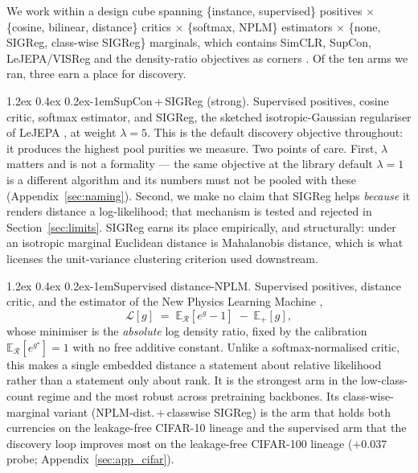 \documentclass{article}
\makeatletter
\renewcommand\paragraph{\@startsection{paragraph}{4}{\z@}%
  {1.2ex \@plus 0.4ex \@minus 0.2ex}{-1em}{\normalsize\bf}}
\newcommand{\E}{\mathbb{E}}
\newcommand{\R}{\mathcal{R}}
\makeatother
\begin{document}
We work within a design cube spanning
\{instance, supervised\} positives $\times$
\{cosine, bilinear, distance\} critics $\times$
\{softmax, NPLM\} estimators $\times$
\{none, SIGReg, class-wise SIGReg\} marginals, which contains SimCLR,
SupCon, LeJEPA/VISReg and the density-ratio objectives as corners
\citep{chen2020simclr,khosla2020supcon,balestriero2025lejepa,wu2026visreg,dagnolo2019nplm}.
Of the ten arms we ran, three earn a place for discovery.

\paragraph{SupCon\,+\,SIGReg (strong).}
Supervised positives, cosine critic, softmax estimator, and SIGReg, the
sketched isotropic-Gaussian regulariser of LeJEPA
\citep{balestriero2025lejepa}, at weight $\lambda = 5$. This is the default discovery objective throughout: it
produces the highest pool purities we measure. Two points of care. First, $\lambda$ matters and is not a formality --- the same objective
at the library default $\lambda = 1$ is a different algorithm and its numbers
must not be pooled with these (Appendix~\ref{sec:naming}). Second, we make no
claim that SIGReg helps \emph{because} it renders distance a log-likelihood;
that mechanism is tested and rejected in Section~\ref{sec:limits}. SIGReg
earns its place empirically, and structurally: under an isotropic marginal
Euclidean distance is Mahalanobis distance, which is what licenses the
unit-variance clustering criterion used downstream.

\paragraph{Supervised distance-NPLM.}
Supervised positives, distance critic, and the estimator of the New Physics
Learning Machine \citep[NPLM;][]{dagnolo2019nplm},
\begin{equation}
\label{eq:nplm}
\mathcal{L}[g] \;=\; \E_{\R}\!\left[e^{g} - 1\right] \;-\; \E_{+}\!\left[g\right],
\end{equation}
whose minimiser is the \emph{absolute} log density ratio, fixed by the
calibration $\E_{\R}[e^{g^\star}] = 1$ with no free additive constant. Unlike
a softmax-normalised critic, this makes a single embedded distance a statement
about relative likelihood rather than a statement only about rank. It is the
strongest arm in the low-class-count regime and the most robust across
pretraining backbones. Its class-wise-marginal variant (NPLM-dist.\,+\,classwise
SIGReg) is the arm that holds both currencies on the leakage-free CIFAR-10
lineage and the supervised arm that the discovery loop improves most on the
leakage-free CIFAR-100 lineage ($+0.037$ probe;
Appendix~\ref{sec:app_cifar}).
\end{document}
